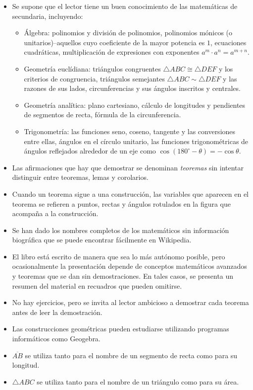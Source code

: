 \begin{itemize}
\item Se supone que el lector tiene un buen conocimiento de las matemáticas de secundaria, incluyendo:
\begin{itemize}
\item Álgebra: polinomios y división de polinomios, polinomios mónicos (o unitarios)--aquellos cuyo coeficiente de la mayor potencia es $1$, ecuaciones cuadráticas, multiplicación de expresiones con exponentes $a^m\cdot a^n=a^{m+n}$.
\item Geometría euclídiana: triángulos congruentes $\triangle ABC \cong \triangle DEF$ y los criterios de congruencia, triángulos semejantes $\triangle ABC \sim \triangle DEF$ y las razones de sus lados, circunferencias y sus ángulos inscritos y centrales.
\item Geometría analítica: plano cartesiano, cálculo de longitudes y pendientes de segmentos de recta, fórmula de la circunferencia.
\item Trigonometría: las funciones seno, coseno, tangente y las conversiones entre ellas, ángulos en el círculo unitario, las funciones trigonométricas de ángulos reflejados alrededor de un eje como $\cos (180^\circ-\theta)=-\cos\theta$.
\end{itemize}
\item Las afirmaciones que hay que demostrar se denominan \emph{teoremas} sin intentar distinguir entre teoremas, lemas y corolarios.
\item Cuando un teorema sigue a una construcción, las variables que aparecen en el teorema se refieren a puntos, rectas y ángulos rotulados en la figura que acompaña a la construcción.
\item Se han dado los nombres completos de los matemáticos sin información biográfica que se puede encontrar fácilmente en Wikipedia.
\item El libro está escrito de manera que sea lo más autónomo posible, pero ocasionalmente la presentación depende de conceptos matemáticos avanzados y teoremas que se dan sin demostraciones. En tales casos, se presenta un resumen del material en recuadros que pueden omitirse.
\item No hay ejercicios, pero se invita al lector ambicioso a demostrar cada teorema antes de leer la demostración.
\item Las construcciones geométricas pueden estudiarse utilizando programas informáticos como Geogebra.
\item $\overline{AB}$ se utiliza tanto para el nombre de un segmento de recta como para su longitud.
\item $\triangle ABC$ se utiliza tanto para el nombre de un triángulo como para su área.
\end{itemize}



